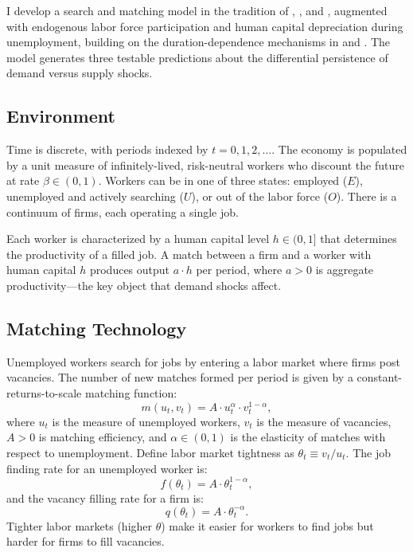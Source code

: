 \documentclass[12pt]{article}
\begin{document}
I develop a search and matching model in the tradition of \citet{diamond1982aggregate}, \citet{mortensen1994job}, and \citet{pissarides1985short}, augmented with endogenous labor force participation and human capital depreciation during unemployment, building on the duration-dependence mechanisms in \citet{pissarides1992loss} and \citet{gertler2009unemployment}. The model generates three testable predictions about the differential persistence of demand versus supply shocks.

\subsection{Environment}

Time is discrete, with periods indexed by $t = 0, 1, 2, \ldots$. The economy is populated by a unit measure of infinitely-lived, risk-neutral workers who discount the future at rate $\beta \in (0,1)$. Workers can be in one of three states: employed ($E$), unemployed and actively searching ($U$), or out of the labor force ($O$). There is a continuum of firms, each operating a single job.

Each worker is characterized by a human capital level $h \in (0,1]$ that determines the productivity of a filled job. A match between a firm and a worker with human capital $h$ produces output $a \cdot h$ per period, where $a > 0$ is aggregate productivity---the key object that demand shocks affect.

\subsection{Matching Technology}

Unemployed workers search for jobs by entering a labor market where firms post vacancies. The number of new matches formed per period is given by a constant-returns-to-scale matching function:
\begin{equation}
m(u_t, v_t) = A \cdot u_t^{\alpha} \cdot v_t^{1 - \alpha},
\label{eq:matching}
\end{equation}
where $u_t$ is the measure of unemployed workers, $v_t$ is the measure of vacancies, $A > 0$ is matching efficiency, and $\alpha \in (0,1)$ is the elasticity of matches with respect to unemployment. Define labor market tightness as $\theta_t \equiv v_t / u_t$. The job finding rate for an unemployed worker is:
\begin{equation}
f(\theta_t) = A \cdot \theta_t^{1 - \alpha},
\label{eq:jobfinding}
\end{equation}
and the vacancy filling rate for a firm is:
\begin{equation}
q(\theta_t) = A \cdot \theta_t^{-\alpha}.
\label{eq:vacfilling}
\end{equation}
Tighter labor markets (higher $\theta$) make it easier for workers to find jobs but harder for firms to fill vacancies.
\end{document}
